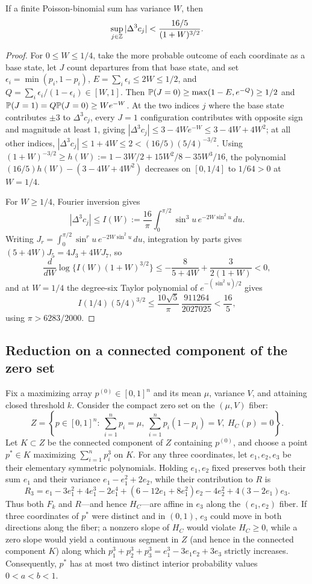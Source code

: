 \begin{lemma}\label{lem:third-difference}
If a finite Poisson-binomial sum has variance $W$, then
\[
                \sup_{j\in\mathbb Z}|\Delta^3c_j|<\frac{16/5}{(1+W)^{3/2}}.
\]
\end{lemma}
\begin{proof}
For $0\le W\le1/4$, take the more probable outcome of each coordinate as a
base state, let $J$ count departures from that base state, and set
$\epsilon_i=\min(p_i,1-p_i)$, $E=\sum_i\epsilon_i\le2W\le1/2$, and
$Q=\sum_i\epsilon_i/(1-\epsilon_i)\in[W,1]$. Then $\mathbb P(J=0)\ge\max(1-E,e^{-Q})\ge1/2$
and $\mathbb P(J=1)=Q\mathbb P(J=0)\ge We^{-W}$. At the two indices $j$ where the base
state contributes $\pm3$ to $\Delta^3c_j$, every $J=1$ configuration
contributes with opposite sign and magnitude at least $1$, giving
$|\Delta^3c_j|\le3-4We^{-W}\le3-4W+4W^2$; at all other indices,
$|\Delta^3c_j|\le1+4W\le2<(16/5)(5/4)^{-3/2}$. Using
$(1+W)^{-3/2}\ge h(W):=1-3W/2+15W^2/8-35W^3/16$, the polynomial
$(16/5)h(W)-(3-4W+4W^2)$ decreases on $[0,1/4]$ to $1/64>0$ at $W=1/4$.

For $W\ge1/4$, Fourier inversion gives
\[
 |\Delta^3c_j|\le I(W):=
 \frac{16}{\pi}\int_0^{\pi/2}\sin^3u\,e^{-2W\sin^2u}\,du.
\]
Writing $J_r=\int_0^{\pi/2}\sin^ru\,e^{-2W\sin^2u}\,du$, integration by parts
gives $(5+4W)J_5=4J_3+4WJ_7$, so
\[
 \frac{d}{dW}\log\bigl\{I(W)(1+W)^{3/2}\bigr\}
 \le-\frac8{5+4W}+\frac3{2(1+W)}<0,
\]
and at $W=1/4$ the degree-six Taylor polynomial of $e^{-(\sin^2u)/2}$ gives
\[
 I(1/4)(5/4)^{3/2}
 \le\frac{10\sqrt5}{\pi}\,
       \frac{911264}{2027025}<\frac{16}{5},
\]
using $\pi>6283/2000$.
\end{proof}

\subsection{Reduction on a connected component of the zero set}

Fix a maximizing array $p^{(0)}\in[0,1]^n$ and its mean $\mu$, variance $V$,
and attaining closed threshold $k$. Consider the compact zero set on the
$(\mu,V)$ fiber:
\[
 Z=\left\{p\in[0,1]^n:\ \sum_{i=1}^n p_i=\mu,\
                  \sum_{i=1}^n p_i(1-p_i)=V,\ H_C(p)=0\right\}.
\]
Let $K\subset Z$ be the connected component of $Z$ containing $p^{(0)}$, and
choose a point $p^*\in K$ maximizing $\sum_{i=1}^n p_i^3$ on $K$. For any
three coordinates, let $e_1,e_2,e_3$ be their elementary symmetric
polynomials. Holding $e_1,e_2$ fixed preserves both their sum $e_1$ and their
variance $e_1-e_1^2+2e_2$, while their contribution to $R$ is
\[
 R_3=e_1-3e_1^2+4e_1^3-2e_1^4
 +(6-12e_1+8e_1^2)e_2-4e_2^2+4(3-2e_1)e_3.
\]
Thus both $F_k$ and $R$---and hence $H_C$---are affine in $e_3$ along the
$(e_1,e_2)$ fiber. If three coordinates of $p^*$ were distinct and in $(0,1)$,
$e_3$ could move in both directions along the fiber; a nonzero slope of $H_C$
would violate $H_C\ge0$, while a zero slope would yield a continuous segment
in $Z$ (and hence in the connected component $K$) along which
$p_1^3+p_2^3+p_3^3=e_1^3-3e_1e_2+3e_3$ strictly increases. Consequently,
$p^*$ has at most two distinct interior probability values $0<a<b<1$.

